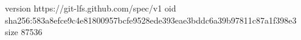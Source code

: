 version https://git-lfs.github.com/spec/v1
oid sha256:583a8efce9c4e81800957bcfe9528ede393eae3bddc6a39b97811c87a1f398e3
size 87536
